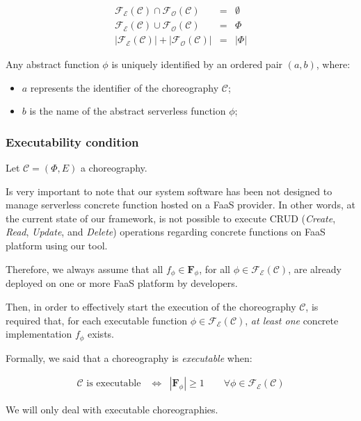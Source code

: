 \documentclass[12pt,a4paper]{report}
\theoremstyle{definition}
\begin{document}
\begin{eqnarray}
	\mathscr{F_E}(\mathcal{C}) \cap \mathscr{F_O}(\mathcal{C}) & = & \emptyset \\
	\mathscr{F_E}(\mathcal{C}) \cup \mathscr{F_O}(\mathcal{C}) & = & \Phi \\
	|\mathscr{F_E}(\mathcal{C})| + |\mathscr{F_O}(\mathcal{C})| &=& |\Phi| 
\end{eqnarray}

Any abstract function $\phi$ is uniquely identified by an ordered pair $(a, b)$, where:
\begin{itemize}
	\item $a$ represents the identifier of the choreography $\mathcal{C}$;
	\item $b$ is the name of the abstract serverless function $\phi$;
\end{itemize}

\subsubsection{Executability condition}

Let $\mathcal{C} = (\Phi,E)$ a choreography.

Is very important to note that our system software has been not designed to manage serverless concrete function hosted on a FaaS provider. In other words, at the current state of our framework, is not possible to execute CRUD (\textit{Create}, \textit{Read}, \textit{Update}, and \textit{Delete}) operations regarding concrete functions on FaaS platform using our tool.

Therefore, we always assume that all $f_{\phi} \in \textbf{F}_{\phi}$, for all $\phi \in \mathscr{F_E}(\mathcal{C})$, are already deployed on one or more FaaS platform by developers. 

Then, in order to effectively start the execution of the choreography $\mathcal{C}$, is required that, for each executable function $\phi \in \mathscr{F_E}(\mathcal{C})$, \textit{at least one} concrete implementation $f_{\phi}$ exists.

Formally, we said that a choreography is \textit{executable} when: 

\begin{eqnarray}
	\label{eqn:SchedulabilityConditionOne}
	\mathcal{C} \text{ is executable } & \Leftrightarrow & |\textbf{F}_{\phi}| \geq 1 \qquad \forall \phi \in \mathscr{F_E}(\mathcal{C})
\end{eqnarray}

We will only deal with executable choreographies.
\end{document}
